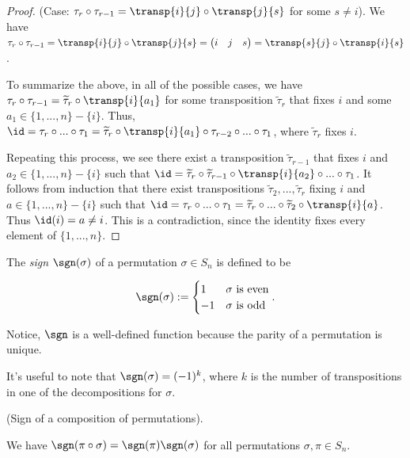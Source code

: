 \begin{proof}
{{            \fullindent
            {
                (Case: $\tau_r \circ \tau_{r - 1} = \transp{i}{j} \circ \transp{j}{s}$ for some $s \neq i$). We have $\tau_r \circ \tau_{r - 1} = \transp{i}{j} \circ \transp{j}{s} = \begin{pmatrix} i & j & s \end{pmatrix} = \transp{s}{j} \circ \transp{i}{s}$.
            }
        }
    }

    \newcommand{\tttau}{\widetilde{\tau}}
            
    To summarize the above, in all of the possible cases, we have $\tau_r \circ \tau_{r - 1} = \tttau_r \circ \transp{i}{a_1}$ for some transposition $\tttau_r$ that fixes $i$ and some $a_1 \in \{1, ..., n\} - \{i\}$. Thus, $\id = \tau_r \circ ... \circ \tau_1 = \tttau_r \circ \transp{i}{a_1} \circ \tau_{r - 2} \circ ... \circ \tau_1$, where $\tttau_r$ fixes $i$.
    
    Repeating this process, we see there exist a transposition $\tttau_{r - 1}$ that fixes $i$ and $a_2 \in \{1, ..., n\} - \{i\}$ such that $\id = \tttau_r \circ \tttau_{r - 1} \circ \transp{i}{a_2} \circ ... \circ \tau_1$. It follows from induction that there exist transpositions $\tttau_2, ..., \tttau_r$ fixing $i$ and $a \in \{1, ..., n\} - \{i\}$ such that $\id = \tau_r \circ ... \circ \tau_1 = \tttau_r \circ ... \circ \tttau_2 \circ \transp{i}{a}$. Thus $\id(i) = a \neq i$. This is a contradiction, since the identity fixes every element of $\{1, ..., n\}$.
\end{proof}

\begin{defn}
    The \textit{sign} $\sgn(\sigma)$ of a permutation $\sigma \in S_n$ is defined to be
    
    \begin{align*}
        \sgn(\sigma) := 
        \begin{cases}
            1 & \text{$\sigma$ is even} \\
            -1 & \text{$\sigma$ is odd}
        \end{cases}.
    \end{align*}

    Notice, $\sgn$ is a well-defined function because the parity of a permutation is unique.

    It's useful to note that $\sgn(\sigma) = (-1)^k$, where $k$ is the number of transpositions in one of the decompositions for $\sigma$.
\end{defn}

\begin{theorem}
    (Sign of a composition of permutations).

    We have $\sgn(\pi \circ \sigma) = \sgn(\pi) \sgn(\sigma)$ for all permutations $\sigma, \pi \in S_n$.
\end{theorem}

